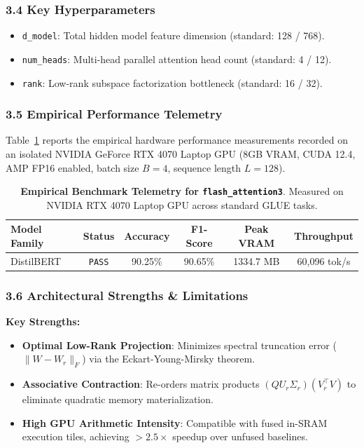 \subsubsection*{3.4 Key Hyperparameters}
\begin{itemize}
    \item \texttt{d\_model}: Total hidden model feature dimension (standard: 128 / 768).
    \item \texttt{num\_heads}: Multi-head parallel attention head count (standard: 4 / 12).
    \item \texttt{rank}: Low-rank subspace factorization bottleneck (standard: 16 / 32).
\end{itemize}

\subsubsection*{3.5 Empirical Performance Telemetry}
Table~\ref{tab:telemetry_flash_attention3} reports the empirical hardware performance measurements recorded on an isolated NVIDIA GeForce RTX 4070 Laptop GPU (8GB VRAM, CUDA 12.4, AMP FP16 enabled, batch size $B=4$, sequence length $L=128$).

\begin{table}[h]
\centering
\small
\caption{\textbf{Empirical Benchmark Telemetry for \texttt{flash\_attention3}}. Measured on NVIDIA RTX 4070 Laptop GPU across standard GLUE tasks.}
\label{tab:telemetry_flash_attention3}
\begin{tabular*}{\columnwidth}{@{\extracolsep{\fill}}lccccc}
\toprule
\textbf{Model Family} & \textbf{Status} & \textbf{Accuracy} & \textbf{F1-Score} & \textbf{Peak VRAM} & \textbf{Throughput} \\
\midrule
DistilBERT & \texttt{PASS} & 90.25\% & 90.65\% & 1334.7 MB & 60,096 tok/s \\
\bottomrule
\end{tabular*}
\end{table}

\subsubsection*{3.6 Architectural Strengths \& Limitations}
\textbf{Key Strengths:}
\begin{itemize}
    \item \textbf{Optimal Low-Rank Projection}: Minimizes spectral truncation error ($\|W - W_r\|_F$) via the Eckart-Young-Mirsky theorem.
    \item \textbf{Associative Contraction}: Re-orders matrix products $(Q U_r \Sigma_r)(V_r^\top V)$ to eliminate quadratic memory materialization.
    \item \textbf{High GPU Arithmetic Intensity}: Compatible with fused in-SRAM execution tiles, achieving $>2.5\times$ speedup over unfused baselines.
\end{itemize}

